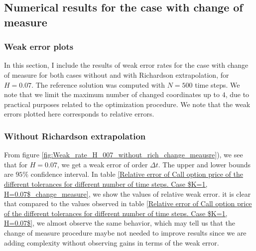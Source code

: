 \documentclass[11pt]{article}
\begin{document}
\FloatBarrier

 
 
 \subsection{Numerical results for the case with change of measure}\label{sec:Numerical results for the case with change of measure}

 \subsubsection{Weak error plots} \label{sec:Weak error plots_with_change}
 In this section, I include the results of weak error rates for the case with change of measure for both cases without and with Richardson extrapolation,  for $H =0.07$. The reference solution was computed with $N=500$ time steps. We note that we limit the maximum number of changed coordinates  up to $4$, due to practical purposes related to the optimization procedure.  We note that the weak errors plotted here corresponds to relative errors.
 
 
 \subsubsection*{Without Richardson extrapolation}
 From figure \ref{fig:Weak_rate_H_007_without_rich_change_meausre}), we see that for $H=0.07$, we get a weak error of order $\Delta t$. The upper and lower bounds are $95\%$ confidence interval. In table \ref{Relative error of Call option price of the different tolerances for different number of time steps. Case $K=1, H=0.07$_change_measure}, we show the values of relative weak error. it is clear that compared to the values observed in table \ref{Relative error of Call option price of the different tolerances for different number of time steps. Case $K=1, H=0.07$}, we almost observe the same behavior, which may tell us that the change of measure procedure maybe not needed to improve results since we are adding complexity without observing gains in terms of the weak error.
 
\end{document}
